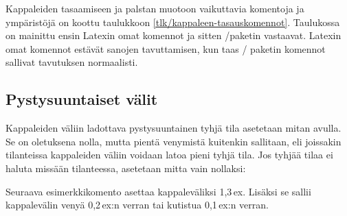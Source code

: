 
Kappaleiden tasaamiseen ja palstan muotoon vaikuttavia komentoja ja
ympäristöjä on koottu taulukkoon \ref{tlk/kappaleen-tasauskomennot}.
Taulukossa on mainittu ensin Latexin omat komennot ja sitten
\-/paketin vastaavat. Latexin omat
komennot estävät sanojen tavuttamisen, kun taas \-/
paketin komennot sallivat tavutuksen normaalisti.

\subsection{Pystysuuntaiset välit}
\label{luku/pystysuuntaiset-välit}

Kappaleiden väliin ladottava pystysuuntainen tyhjä tila asetetaan mitan
 avulla. Se on oletuksena nolla, mutta pientä venymistä
kuitenkin sallitaan, eli joissakin tilanteissa kappaleiden väliin
voidaan latoa pieni tyhjä tila. Jos tyhjää tilaa ei haluta missään
tilanteessa, asetetaan mitta vain nollaksi:

\begin{koodilohkosis}
\setlength{\parskip}{0ex}
\end{koodilohkosis}

Seuraava esimerkkikomento asettaa kappaleväliksi 1,3\,ex. Lisäksi se
sallii kappalevälin venyä 0,2\,ex:n verran tai kutistua 0,1\,ex:n
verran.

